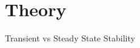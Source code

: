 \section[Theory]{Theory}
\label{sec:lasso_theory}

\begin{frame}[fragile]{Transient vs Steady State Stability}
\end{frame}